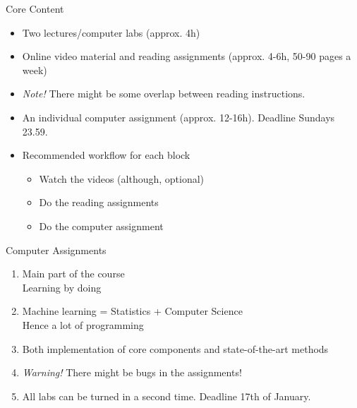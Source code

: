 \documentclass[10pt,handout]{beamer}
\begin{document}
\begin{frame}{Core Content}

\begin{itemize}
\item Two lectures/computer labs (approx. 4h)
\item Online video material and reading assignments (approx. 4-6h, 50-90 pages a week)
\item \emph{Note!} There might be some overlap between reading instructions.
\item An individual computer assignment (approx. 12-16h). Deadline Sundays 23.59.\pause
\item Recommended workflow for each block
\begin{itemize}
\item Watch the videos (although, optional)
\item Do the reading assignments
\item Do the computer assignment
\end{itemize}
\end{itemize}

\end{frame}


\begin{frame}{Computer Assignments}

\begin{enumerate}
\item Main part of the course\\Learning by doing
\item Machine learning = Statistics + Computer Science\\Hence a lot of programming\pause
\item Both implementation of core components and state-of-the-art methods\pause
\item \emph{Warning!} There might be bugs in the assignments!\pause
\item All labs can be turned in a second time. Deadline 17th of January.
\end{enumerate}

\end{frame}
\end{document}
